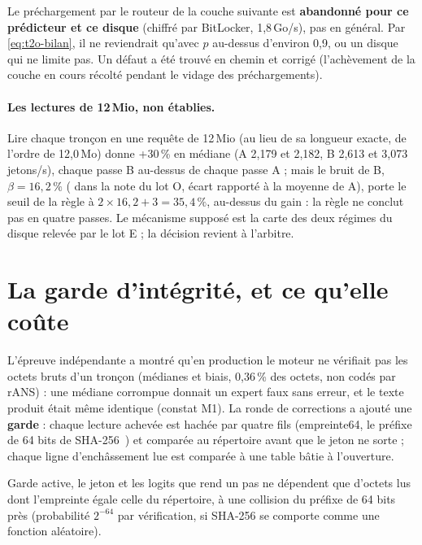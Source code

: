 \begin{enbref}[title={Ce qui est tué, et ce qui ne l'est pas}]
Le préchargement par le routeur de la couche suivante est \textbf{abandonné pour ce prédicteur et ce disque} (chiffré par BitLocker, 1,8\,Go/s), pas en général. Par \eqref{eq:t2o-bilan}, il ne reviendrait qu'avec $p$ au-dessus d'environ 0,9, ou un disque qui ne limite pas. Un défaut a été trouvé en chemin et corrigé (l'achèvement de la couche en cours récolté pendant le vidage des préchargements).
\end{enbref}

\paragraph{Les lectures de 12\,Mio, non établies.} Lire chaque tronçon en une requête de 12\,Mio (au lieu de sa longueur exacte, de l'ordre de 12,0\,Mo) donne +30\,\% en médiane (A 2,179 et 2,182, B 2,613 et 3,073 jetons/s), chaque passe B au-dessus de chaque passe A ; mais le bruit de B, $\beta = 16{,}2\,\%$ ( dans la note du lot O, écart rapporté à la moyenne de A), porte le seuil de la règle à $2 \times 16{,}2 + 3 = 35{,}4\,\%$, au-dessus du gain : la règle ne conclut pas en quatre passes. Le mécanisme supposé est la carte des deux régimes du disque relevée par le lot E ; la décision revient à l'arbitre.

\section{La garde d'intégrité, et ce qu'elle coûte}\label{sec:t2o-garde}

L'épreuve indépendante a montré qu'en production le moteur ne vérifiait pas les octets bruts d'un tronçon (médianes et biais, 0,36\,\% des octets, non codés par rANS) : une médiane corrompue donnait un expert faux sans erreur, et le texte produit était même identique (constat M1). La ronde de corrections a ajouté une \textbf{garde} : chaque lecture achevée est hachée par quatre fils (empreinte64, le préfixe de 64 bits de SHA-256~\cite{fips180-4}) et comparée au répertoire avant que le jeton ne sorte ; chaque ligne d'enchâssement lue est comparée à une table bâtie à l'ouverture.

\begin{proposition}\label{prop:t2o-garde}
Garde active, le jeton et les logits que rend un pas ne dépendent que d'octets lus dont l'empreinte égale celle du répertoire, à une collision du préfixe de 64 bits près (probabilité $2^{-64}$ par vérification, si SHA-256 se comporte comme une fonction aléatoire).
\end{proposition}

